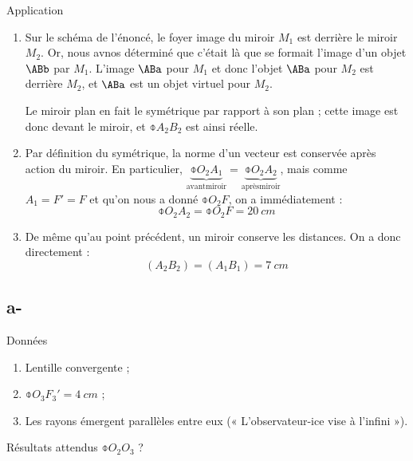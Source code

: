 \documentclass[10pt,notitlepage]{book}
\begin{document}
\begin{NCexem}{Application}
    \begin{enumerate}
        \item Sur le schéma de l'énoncé, le foyer image du miroir $M_1$ est
            derrière le miroir $M_2$. Or, nous avnos déterminé que c'était là
            que se formait l'image d'un objet $\ABb$ par $M_1$. L'image $\ABa$
            pour $M_1$ et donc l'objet $\ABa$ pour $M_2$ est derrière $M_2$, et
            $\ABa$ est un objet virtuel pour $M_2$.

            Le miroir plan en fait le symétrique par rapport à son plan ;
            cette image est donc devant le miroir, et $\obar{A_2B_2}$ est ainsi
            réelle.

        \item Par définition du symétrique, la norme d'un vecteur est conservée
            après action du miroir. En particulier,
            $\underbrace{\obar{O_2A_1}}_\mathrm{avant miroir} =
            \underbrace{\obar{O_2A_2}}_\mathrm{après miroir}$, mais comme $A_1 = F' =
            F$ et qu'on nous a donné $\obar{O_2F}$, on a immédiatement :
            \[ \boxed{\obar{O_2A_2}= \obar{O_2F} = \SI{20}{cm}} \]

        \item De même qu'au point précédent, un miroir conserve les distances.
            On a donc directement :
            \[ \boxed{ \left(A_2B_2\right) = \left(A_1B_1\right)
                                           = \SI{7}{cm}} \]
    \end{enumerate}
\end{NCexem}

\subsection{a-}
\begin{NCdefi}{Données}
    \begin{enumerate}
        \item Lentille convergente ;
        \item $\obar{O_3F_3'} = \SI{4}{cm}$ ;
        \item Les rayons émergent parallèles entre eux (« L'observateur-ice vise
            à l'infini »).
    \end{enumerate}
\end{NCdefi}

\begin{NCprop}{Résultats attendus}
    $\obar{O_2O_3}$ ?
\end{NCprop}
\end{document}
